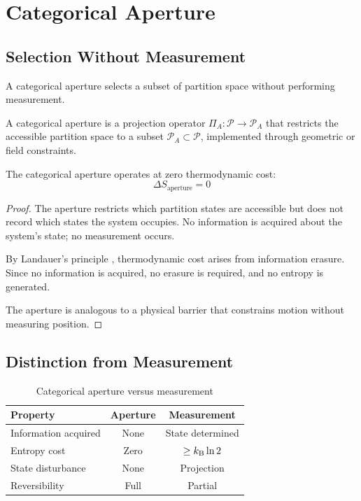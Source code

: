 \section{Categorical Aperture}
\label{sec:aperture}

\subsection{Selection Without Measurement}

A categorical aperture selects a subset of partition space without performing measurement.

\begin{definition}
\label{def:aperture}
A categorical aperture is a projection operator $\Pi_A: \mathcal{P} \to \mathcal{P}_A$ that restricts the accessible partition space to a subset $\mathcal{P}_A \subset \mathcal{P}$, implemented through geometric or field constraints.
\end{definition}

\begin{theorem}
\label{thm:zerocost}
The categorical aperture operates at zero thermodynamic cost:
\begin{equation}
    \Delta S_{\mathrm{aperture}} = 0
\end{equation}
\end{theorem}

\begin{proof}
The aperture restricts which partition states are accessible but does not record which states the system occupies. No information is acquired about the system's state; no measurement occurs.

By Landauer's principle \citep{landauer1961}, thermodynamic cost arises from information erasure. Since no information is acquired, no erasure is required, and no entropy is generated.

The aperture is analogous to a physical barrier that constrains motion without measuring position.
\end{proof}

\subsection{Distinction from Measurement}

\begin{table}[h]
\centering
\caption{Categorical aperture versus measurement}
\label{tab:aperture}
\begin{tabular}{lcc}
\toprule
\textbf{Property} & \textbf{Aperture} & \textbf{Measurement} \\
\midrule
Information acquired & None & State determined \\
Entropy cost & Zero & $\geq k_{\mathrm{B}} \ln 2$ \\
State disturbance & None & Projection \\
Reversibility & Full & Partial \\
\bottomrule
\end{tabular}
\end{table}

